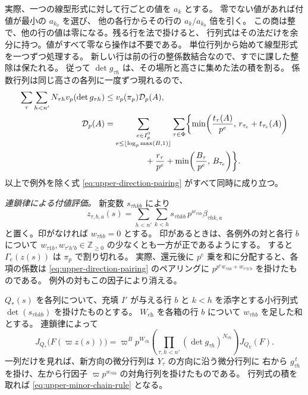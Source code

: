 実際、一つの線型形式に対して行ごとの値を \(a_k\) とする。
零でない値があれば付値が最小の \(a_{k_0}\) を選び、
他の各行からその行の \(a_k/a_{k_0}\) 倍を引く。
この商は整で、他の行の値は零になる。残る行を法で掛けると、
行列式はその法だけを余分に持つ。値がすべて零なら操作は不要である。
単位行列から始めて線型形式を一つずつ処理する。
新しい行は前の行の整係数結合なので、すでに課した整除は保たれる。
従って \(\det g_{\tau h}\) は、その場所と高さに集めた法の積を割る。
係数行列は同じ高さの各列に一度ずつ現れるので、
\[
 \begin{aligned}
  \sum_{\tau}\sum_{h<n'}N_{\tau h}v_p(\det g_{\tau h})
   &\le v_p(\pi_p)\mathcal D_p(A),\\
  \mathcal D_p(A)
   &=\sum_{\substack{e\in I_p^0\\e\le\lfloor\log_p\max(B,1)\rfloor}}
       \sum_{\tau\in\Phi}
       \biggl\{\min\!\left(\frac{t_\tau(A)}{p^e},\,r_{\tau_e}+t_{\tau_e}(A)\right)\\
   &\hphantom{=\sum_e\sum_\tau\biggl\{}{}
          +\frac{r_\tau}{p^e}
          +\min\!\left(\frac{B_\tau}{p^e},\,B_{\tau_e}\right)\biggr\}.
 \end{aligned}
\]
以上で例外を除く式 \eqref{eq:upper-direction-pairing} がすべて同時に成り立つ。

\emph{連鎖律による付値評価。}
新変数 \(s_{\tau h k b}\) により
\[
 z_{\tau,b,a}(s)=\sum_{h<n'}\sum_{k<h}s_{\tau h k b}\,p^{w_{\tau h b}}\beta_{\tau h k,a}
\]
と置く。印がなければ \(w_{\tau h b}=0\) とする。
印があるときは、各例外の対と各行 \(b\) について
\(w_{\tau 1 b},w_{\tau' h' b}\in\mathbb Z_{\ge0}\) の少なくとも一方が正であるようにする。
すると \(\Gamma_e(z(s))\) は \(\pi_p\) で割り切れる。
実際、還元後に \(p^e\) 乗を和に分配すると、各項の係数は
\eqref{eq:upper-direction-pairing} のペアリングに
\(p^{p^e w_{\tau h b}+w_{\tau' h' b}}\) を掛けたものである。
例外の対もこの因子により消える。

\(Q_*(s)\) を各列について、充填 \(I'\) が与える行 \(b\) と
\(k<h\) を添字とする小行列式 \(\det(s_{\tau h k b})\) を掛けたものとする。
\(W_\mathrm{ch}\) を各箱の行 \(b\) について \(w_{\tau h b}\) を足した和とする。
連鎖律によって
\begin{equation}\label{eq:upper-minor-chain-rule}
 J_{Q_*}\bigl(F(\varpi z(s))\bigr)
 = \varpi^B p^{W_\mathrm{ch}}\!
    \left(\prod_{\tau,h<n'}(\det g_{\tau h})^{N_{\tau h}}\right)J_{Q_Y}(F).
\end{equation}
一列だけを見れば、新方向の微分行列は \(Y_\tau\) の方向に沿う微分行列に
右から \(g_{\tau h}^{\,t}\) を掛け、左から行因子
\(\varpi p^{w_{\tau h b}}\) の対角行列を掛けたものである。
行列式の積を取れば \eqref{eq:upper-minor-chain-rule} となる。

